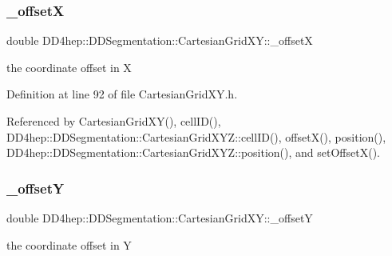 \hypertarget{class_d_d4hep_1_1_d_d_segmentation_1_1_cartesian_grid_x_y_a5ed72cda8a6f4df2c8b4275646ec8d58}{}\label{class_d_d4hep_1_1_d_d_segmentation_1_1_cartesian_grid_x_y_a5ed72cda8a6f4df2c8b4275646ec8d58} 
\subsubsection{\texorpdfstring{\+\_\+offsetX}{\_offsetX}}
{\footnotesize\ttfamily double D\+D4hep\+::\+D\+D\+Segmentation\+::\+Cartesian\+Grid\+X\+Y\+::\+\_\+offsetX\hspace{0.3cm}{\ttfamily [protected]}}



the coordinate offset in X 



Definition at line 92 of file Cartesian\+Grid\+X\+Y.\+h.



Referenced by Cartesian\+Grid\+X\+Y(), cell\+I\+D(), D\+D4hep\+::\+D\+D\+Segmentation\+::\+Cartesian\+Grid\+X\+Y\+Z\+::cell\+I\+D(), offset\+X(), position(), D\+D4hep\+::\+D\+D\+Segmentation\+::\+Cartesian\+Grid\+X\+Y\+Z\+::position(), and set\+Offset\+X().

\hypertarget{class_d_d4hep_1_1_d_d_segmentation_1_1_cartesian_grid_x_y_ad6ba3d39c309d2a64ce8cd5a784d27c4}{}\label{class_d_d4hep_1_1_d_d_segmentation_1_1_cartesian_grid_x_y_ad6ba3d39c309d2a64ce8cd5a784d27c4} 
\subsubsection{\texorpdfstring{\+\_\+offsetY}{\_offsetY}}
{\footnotesize\ttfamily double D\+D4hep\+::\+D\+D\+Segmentation\+::\+Cartesian\+Grid\+X\+Y\+::\+\_\+offsetY\hspace{0.3cm}{\ttfamily [protected]}}



the coordinate offset in Y 



